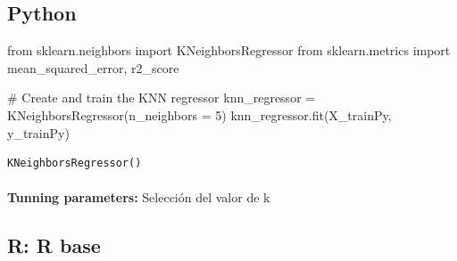 \documentclass[
  letterpaper,
  DIV=11,
  numbers=noendperiod]{scrartcl}
\makeatletter
\let\oldparagraph\paragraph
\renewcommand{\paragraph}{
    \@ifstar
      \xxxParagraphStar
      \xxxParagraphNoStar
  }
\newcommand{\xxxParagraphStar}[1]{\oldparagraph*{#1}\mbox{}}
\newcommand{\xxxParagraphNoStar}[1]{\oldparagraph{#1}\mbox{}}
\newenvironment{Shaded}{\begin{snugshade}}{\end{snugshade}}
\newcommand{\AttributeTok}[1]{\textcolor[rgb]{0.40,0.45,0.13}{#1}}
\newcommand{\CommentTok}[1]{\textcolor[rgb]{0.37,0.37,0.37}{#1}}
\newcommand{\ControlFlowTok}[1]{\textcolor[rgb]{0.00,0.23,0.31}{\textbf{#1}}}
\newcommand{\DecValTok}[1]{\textcolor[rgb]{0.68,0.00,0.00}{#1}}
\newcommand{\FunctionTok}[1]{\textcolor[rgb]{0.28,0.35,0.67}{#1}}
\newcommand{\ImportTok}[1]{\textcolor[rgb]{0.00,0.46,0.62}{#1}}
\newcommand{\NormalTok}[1]{\textcolor[rgb]{0.00,0.23,0.31}{#1}}
\newcommand{\OperatorTok}[1]{\textcolor[rgb]{0.37,0.37,0.37}{#1}}
\newcommand{\OtherTok}[1]{\textcolor[rgb]{0.00,0.23,0.31}{#1}}
\newcommand{\SpecialCharTok}[1]{\textcolor[rgb]{0.37,0.37,0.37}{#1}}
\makeatother
\begin{document}
\subsection{Python}

\begin{Shaded}
\begin{Highlighting}[]
\ImportTok{from}\NormalTok{ sklearn.neighbors }\ImportTok{import}\NormalTok{ KNeighborsRegressor}
\ImportTok{from}\NormalTok{ sklearn.metrics }\ImportTok{import}\NormalTok{ mean\_squared\_error, r2\_score}

\CommentTok{\# Create and train the KNN regressor}
\NormalTok{knn\_regressor }\OperatorTok{=}\NormalTok{ KNeighborsRegressor(n\_neighbors }\OperatorTok{=} \DecValTok{5}\NormalTok{)}
\NormalTok{knn\_regressor.fit(X\_trainPy, y\_trainPy)}
\end{Highlighting}
\end{Shaded}

\begin{verbatim}
KNeighborsRegressor()
\end{verbatim}

\paragraph{\texorpdfstring{\textbf{Tunning parameters:} Selección del
valor de
k}{Tunning parameters: Selección del valor de k}}\label{tunning-parameters-selecciuxf3n-del-valor-de-k-1}

\subsection{R: R base}

\begin{Shaded}
\end{Shaded}
\end{document}
